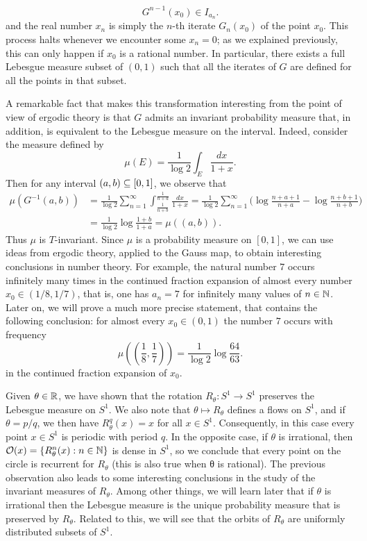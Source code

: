\begin{example}
\[G^{n-1}(x_0)\in I_{a_n}.\]
and the real number $x_n$ is simply the $n$-th iterate $G_n(x_0)$ of the point $x_0$. This process halts whenever we encounter some $x_n=0$; as we explained previously, this can only happen if $x_0$ is a rational number. In particular, there exists a full Lebesgue measure subset of $(0,1)$ such that all the iterates of $G$ are defined for all the points in that subset.\par
A remarkable fact that makes this transformation interesting from the point of view of ergodic theory is that $G$ admits an invariant probability measure that, in addition, is equivalent to the Lebesgue measure on the interval. Indeed, consider the measure defined by
\[\mu(E)=\frac{1}{\log 2}\int_E\frac{dx}{1+x}.\]
Then for any interval $(a,b)\subseteq[0,1]$, we observe that
\begin{align*}
\mu(G^{-1}(a,b))&=\frac{1}{\log 2}\sum_{n=1}^{\infty}\int_{\frac{1}{n+b}}^{\frac{1}{n+a}}\frac{dx}{1+x}=\frac{1}{\log 2}\sum_{n=1}^{\infty}\Big(\log\frac{n+a+1}{n+a}-\log\frac{n+b+1}{n+b}\Big)\\
&=\frac{1}{\log 2}\log\frac{1+b}{1+a}=\mu((a,b)).
\end{align*}
Thus $\mu$ is $T$-invariant. Since $\mu$ is a probability measure on $[0,1]$, we can use ideas from ergodic theory, applied to the Gauss map, to obtain interesting conclusions in number theory. For example, the natural number $7$ occurs infinitely many times in the continued fraction expansion of almost every number $x_0\in(1/8,1/7)$, that is, one has $a_n=7$ for infinitely many values of $n\in\mathbb{N}$. Later on, we will prove a much more precise statement, that contains the following conclusion: for almost every $x_0\in(0,1)$ the number $7$ occurs with frequency
\[\mu((\frac{1}{8},\frac{1}{7}))=\frac{1}{\log 2}\log\frac{64}{63}.\]
in the continued fraction expansion of $x_0$.
\end{example}
\begin{example}
Given $\theta\in\mathbb{R}$, we have shown that the rotation $R_\theta:S^1\to S^1$ preserves the Lebesgue measure on $S^1$. We also note that $\theta\mapsto R_\theta$ defines a flows on $S^1$, and if $\theta=p/q$, we then have $R_\theta^q(x)=x$ for all $x\in S^1$. Consequently, in this case every point $x\in S^1$ is periodic with period $q$. In the opposite case, if $\theta$ is irrational, then $\mathcal{O}(x)=\{R_\theta^n(x):n\in\mathbb{N}\}$ is dense in $S^1$, so we conclude that every point on the circle is recurrent for $R_\theta$ (this is also true when θ is rational). The previous observation also leads to some interesting conclusions in the study of the invariant measures of $R_\theta$. Among other things, we will learn later that if $\theta$ is irrational then the Lebesgue measure is the unique probability measure that is preserved by $R_\theta$. Related to this, we will see that the orbits of $R_\theta$ are uniformly distributed subsets of $S^1$.
\end{example}
